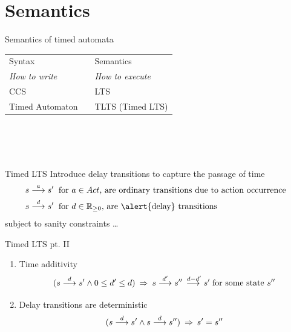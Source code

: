 \documentclass{beamer}
\def\dgold#1{{\alert{#1}}}
\def\gry#1{{\gray #1}}
\begin{document}
\section{Semantics}
\begin{slide}{Semantics of timed automata}
\small\centering
\begin{tabular}{lc@{~~}l}
\toprule 
\dgold{Syntax} && \dgold{Semantics}\\
\cmidrule(lr){1-3}
\gry{\emph{How to write}} & & \gry{\emph{How to execute}}\\
CCS &  & LTS \\
Timed Automaton &  & TLTS (Timed LTS) \\
\bottomrule
\end{tabular}
~\\
~\\
~\\

\vfill
\begin{block}{Timed LTS}
Introduce \alert{delay transitions} to capture the passage of time
\begin{align*}
s \tran{a} s' & \;\; \text{for $a \in Act$, are ordinary transitions due to action occurrence }\\
s \tran{d} s' &\; \;  \text{for $d \in \mathbb{R}_{\geq 0}$, are \alert{delay} transitions}
\end{align*}
subject to sanity constraints \dots 
\end{block}
\end{slide}
\begin{slide}{Timed LTS pt. II}
        \begin{enumerate}
                \item
        Time additivity
        \begin{equation*}
        (s \stackrel{d}{\longrightarrow} s'  \mathbin{\wedge} 0 \leq d' \leq d)\; \mathbin{\Rightarrow}\; s  \stackrel{d'}{\longrightarrow} s'' \stackrel{\; d-d'}{\longrightarrow}           s' \; \text{for some state $s''$}
        \end{equation*}
        \item Delay transitions are deterministic
        \begin{equation*}
        (s \stackrel{d}{\longrightarrow} s'  \mathbin{\wedge} s \stackrel{d}{\longrightarrow} s'')\; \mathbin{\Rightarrow}\; s'  = s''
        \end{equation*}
        \end{enumerate}
\end{slide}
\end{document}
